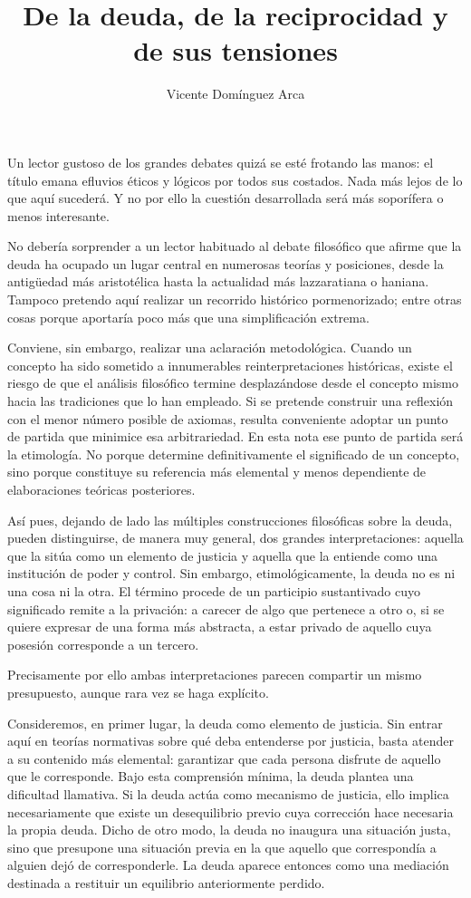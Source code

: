 \documentclass[11pt,a4paper]{article}
\title{\textbf{De la deuda, de la reciprocidad y de sus tensiones}}
\author{Vicente Domínguez Arca}
\date{}
\begin{document}
\maketitle

Un lector gustoso de los grandes debates quizá se esté frotando las manos: el título emana efluvios éticos y lógicos por todos sus costados. Nada más lejos de lo que aquí sucederá. Y no por ello la cuestión desarrollada será más soporífera o menos interesante.

No debería sorprender a un lector habituado al debate filosófico que afirme que la deuda ha ocupado un lugar central en numerosas teorías y posiciones, desde la antigüedad más aristotélica hasta la actualidad más lazzaratiana o haniana. Tampoco pretendo aquí realizar un recorrido histórico pormenorizado; entre otras cosas porque aportaría poco más que una simplificación extrema.

Conviene, sin embargo, realizar una aclaración metodológica. Cuando un concepto ha sido sometido a innumerables reinterpretaciones históricas, existe el riesgo de que el análisis filosófico termine desplazándose desde el concepto mismo hacia las tradiciones que lo han empleado. Si se pretende construir una reflexión con el menor número posible de axiomas, resulta conveniente adoptar un punto de partida que minimice esa arbitrariedad. En esta nota ese punto de partida será la etimología. No porque determine definitivamente el significado de un concepto, sino porque constituye su referencia más elemental y menos dependiente de elaboraciones teóricas posteriores.

Así pues, dejando de lado las múltiples construcciones filosóficas sobre la deuda, pueden distinguirse, de manera muy general, dos grandes interpretaciones: aquella que la sitúa como un elemento de justicia y aquella que la entiende como una institución de poder y control. Sin embargo, etimológicamente, la deuda no es ni una cosa ni la otra. El término procede de un participio sustantivado cuyo significado remite a la privación: a carecer de algo que pertenece a otro o, si se quiere expresar de una forma más abstracta, a estar privado de aquello cuya posesión corresponde a un tercero.

Precisamente por ello ambas interpretaciones parecen compartir un mismo presupuesto, aunque rara vez se haga explícito.

Consideremos, en primer lugar, la deuda como elemento de justicia. Sin entrar aquí en teorías normativas sobre qué deba entenderse por justicia, basta atender a su contenido más elemental: garantizar que cada persona disfrute de aquello que le corresponde. Bajo esta comprensión mínima, la deuda plantea una dificultad llamativa. Si la deuda actúa como mecanismo de justicia, ello implica necesariamente que existe un desequilibrio previo cuya corrección hace necesaria la propia deuda. Dicho de otro modo, la deuda no inaugura una situación justa, sino que presupone una situación previa en la que aquello que correspondía a alguien dejó de corresponderle. La deuda aparece entonces como una mediación destinada a restituir un equilibrio anteriormente perdido.
\end{document}
